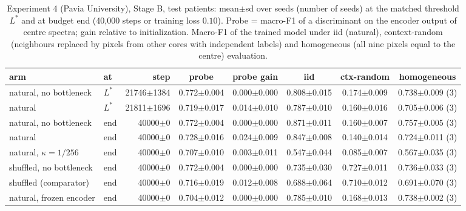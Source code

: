 \begin{table}[htbp]\centering\scriptsize
\caption{Experiment 4 (Pavia University), Stage B, test patients: mean$\pm$sd over seeds (number of seeds) at the matched threshold $L^\ast$ and at budget end (40{,}000 steps or training loss $0.10$). Probe = macro-F1 of a discriminant on the encoder output of centre spectra; gain relative to initialization. Macro-F1 of the trained model under iid (natural), context-random (neighbours replaced by pixels from other cores with independent labels) and homogeneous (all nine pixels equal to the centre) evaluation.}\label{tab:exp4_test_paviau}
\begin{tabular}{llrccccc}\toprule
arm & at & step & probe & probe gain & iid & ctx-random & homogeneous \\ \midrule
natural, no bottleneck & $L^\ast$ & 21746$\pm$1384 & 0.772$\pm$0.004 & 0.000$\pm$0.000 & 0.808$\pm$0.015 & 0.174$\pm$0.009 & 0.738$\pm$0.009 (3) \\
natural & $L^\ast$ & 21811$\pm$1696 & 0.719$\pm$0.017 & 0.014$\pm$0.010 & 0.787$\pm$0.010 & 0.160$\pm$0.016 & 0.705$\pm$0.006 (3) \\
\midrule
natural, no bottleneck & end & 40000$\pm$0 & 0.772$\pm$0.004 & 0.000$\pm$0.000 & 0.871$\pm$0.011 & 0.160$\pm$0.007 & 0.757$\pm$0.005 (3) \\
natural & end & 40000$\pm$0 & 0.728$\pm$0.016 & 0.024$\pm$0.009 & 0.847$\pm$0.008 & 0.140$\pm$0.014 & 0.724$\pm$0.011 (3) \\
natural, $\kappa=1/256$ & end & 40000$\pm$0 & 0.707$\pm$0.010 & 0.003$\pm$0.011 & 0.547$\pm$0.044 & 0.085$\pm$0.007 & 0.567$\pm$0.035 (3) \\
shuffled, no bottleneck & end & 40000$\pm$0 & 0.772$\pm$0.004 & 0.000$\pm$0.000 & 0.735$\pm$0.030 & 0.727$\pm$0.011 & 0.736$\pm$0.033 (3) \\
shuffled (comparator) & end & 40000$\pm$0 & 0.716$\pm$0.019 & 0.012$\pm$0.008 & 0.688$\pm$0.064 & 0.710$\pm$0.012 & 0.691$\pm$0.070 (3) \\
natural, frozen encoder & end & 40000$\pm$0 & 0.704$\pm$0.012 & 0.000$\pm$0.000 & 0.785$\pm$0.010 & 0.168$\pm$0.013 & 0.738$\pm$0.002 (3) \\
\bottomrule
\end{tabular}\end{table}
